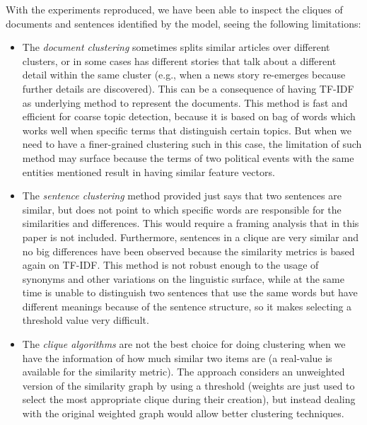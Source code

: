 With the experiments reproduced, we have been able to inspect the cliques of documents and sentences identified by the model, seeing the following limitations:

\begin{itemize}
    \item The \emph{document clustering} sometimes splits similar articles over different clusters, or in some cases has different stories that talk about a different detail within the same cluster (e.g., when a news story re-emerges because further details are discovered).
    This can be a consequence of having TF-IDF as underlying method to represent the documents.
    This method is fast and efficient for coarse topic detection, because it is based on bag of words which works well when specific terms that distinguish certain topics.
    But when we need to have a finer-grained clustering such in this case, the limitation of such method may surface because the terms of two political events with the same entities mentioned result in having similar feature vectors.
    \item The \emph{sentence clustering} method provided just says that two sentences are similar, but does not point to which specific words are responsible for the similarities and differences. This would require a framing analysis that in this paper is not included. Furthermore, sentences in a clique are very similar and no big differences have been observed because the similarity metrics is based again on TF-IDF. This method is not robust enough to the usage of synonyms and other variations on the linguistic surface, while at the same time is unable to distinguish two sentences that use the same words but have different meanings because of the sentence structure, so it makes selecting a threshold value very difficult.
    \item The \emph{clique algorithms} are not the best choice for doing clustering when we have the information of how much similar two items are (a real-value is available for the similarity metric). The approach considers an unweighted version of the similarity graph by using a threshold (weights are just used to select the most appropriate clique during their creation), but instead dealing with the original weighted graph would allow better clustering techniques. %
\end{itemize}


